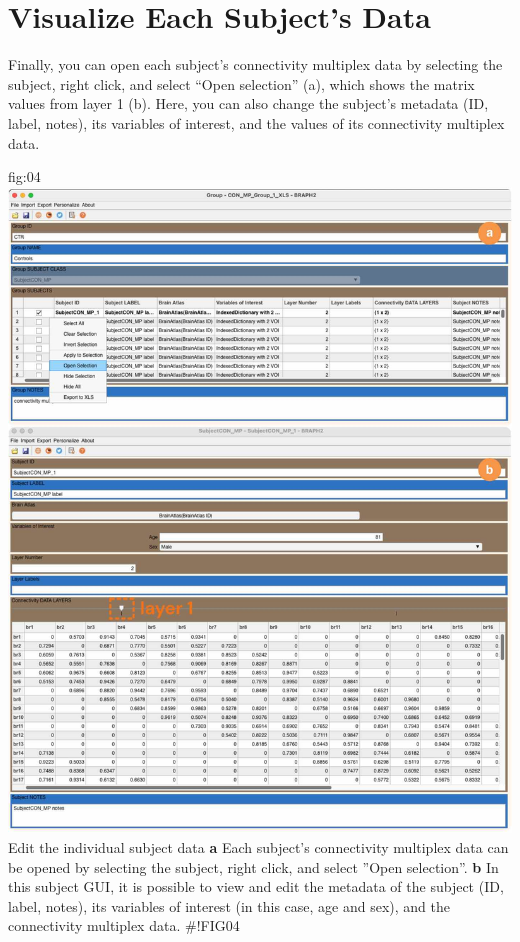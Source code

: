 \documentclass[justified]{tufte-handout}
\begin{document}
\section{Visualize Each Subject's Data}

Finally, you can open each subject's connectivity multiplex data by selecting the subject, right click, and select ``Open selection'' (a), which shows the matrix values from layer 1 (b). Here, you can also change the subject's metadata (ID, label, notes), its variables of interest, and the values of its connectivity multiplex data.

	{fig:04}
	{\includegraphics{fig04.jpg}
	}
	{Edit the individual subject data}
	{
	{\bf a}  Each subject's connectivity multiplex data can be opened by selecting the subject, right click, and select ''Open selection''. 
	{\bf b} In this subject GUI, it is possible to view and edit the metadata of the subject (ID, label, notes), its variables of interest (in this case, age and sex), and the connectivity multiplex data. 
	}
#!FIG04
\end{document}
